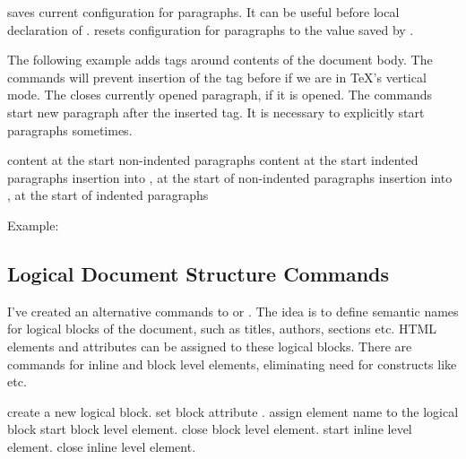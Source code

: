  saves current configuration for paragraphs. It can be
useful before local declaration of .
 resets configuration for paragraphs to the value saved by
.


The following example adds  tags around contents of the document body.
The \texcommand{\ifvmode\IgnorePar\fi} commands will prevent insertion of the  tag 
before  if we are in \TeX's vertical mode. The \texcommand{\EndP} closes currently
opened paragraph, if it is opened. The \texcommand{\par\ShowPar} commands start new paragraph
after the inserted  tag. It is necessary to explicitly start paragraphs sometimes.

\begin{texsource}
{\ifvmode\IgnorePar\fi\EndP
 \par\ShowPar}
{\ifvmode\IgnorePar\fi\EndP
 }
\end{texsource}


 {content at the start non-indented paragraphs} 
   {content at the start indented paragraphs}
   {insertion into , at the start of non-indented paragraphs}
   {insertion into , at the start of indented paragraphs} \EndDoc

Example:

\begin{texsource}
{\EndP{}}
{\EndP{}}
{}
{}
\end{texsource}



\subsection{Logical Document Structure Commands}
I've created an alternative commands to  or . 
The idea is to define semantic names for logical blocks of the document, such as titles, authors,
sections etc. HTML elements and attributes can be assigned to these
logical blocks. There are commands for inline and block level elements,
eliminating need for constructs like \texcommand{\ifvmode\IgnorePar\fi\EndP}
etc.

 create a new logical block.
 set block attribute .
 assign element name to the logical block
 start block level element.
 close block level element.
 start inline level element.
 close inline level element.


